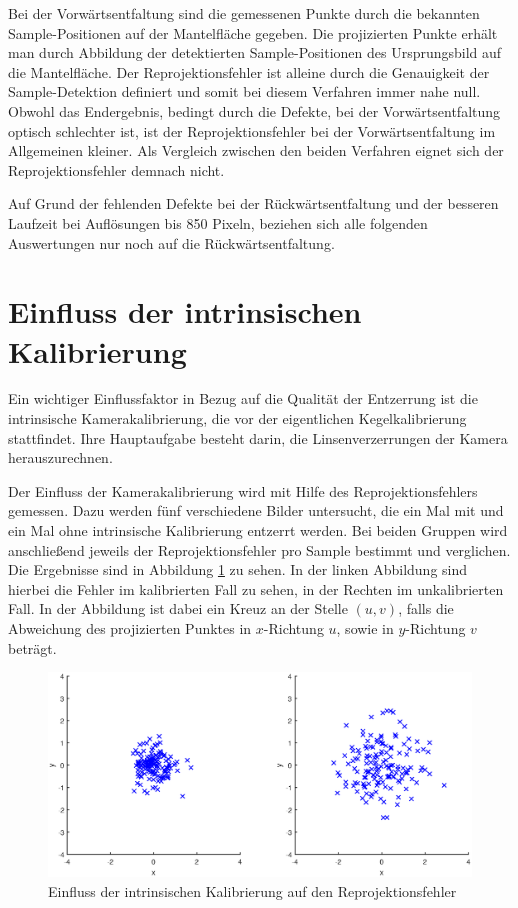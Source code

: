 Bei der Vorwärtsentfaltung sind die gemessenen Punkte durch die bekannten Sample-Positionen auf der Mantelfläche gegeben. Die projizierten Punkte erhält man durch Abbildung der detektierten Sample-Positionen des Ursprungsbild auf die Mantelfläche. Der Reprojektionsfehler ist alleine durch die Genauigkeit der Sample-Detektion definiert und somit bei diesem Verfahren immer nahe null.
Obwohl das Endergebnis, bedingt durch die Defekte, bei der Vorwärtsentfaltung optisch schlechter ist, ist der Reprojektionsfehler bei der Vorwärtsentfaltung im Allgemeinen kleiner.
Als Vergleich zwischen den beiden Verfahren eignet sich der Reprojektionsfehler demnach nicht.

Auf Grund der fehlenden Defekte bei der Rückwärtsentfaltung und der besseren Laufzeit bei Auflösungen bis 850 Pixeln, beziehen sich alle folgenden Auswertungen nur noch auf die Rückwärtsentfaltung.


\section{Einfluss der intrinsischen Kalibrierung}
Ein wichtiger Einflussfaktor in Bezug auf die Qualität der Entzerrung ist die intrinsische Kamerakalibrierung, die vor der eigentlichen Kegelkalibrierung stattfindet. Ihre Hauptaufgabe besteht darin, die Linsenverzerrungen der Kamera herauszurechnen.

Der Einfluss der Kamerakalibrierung wird mit Hilfe des Reprojektionsfehlers gemessen. Dazu werden fünf verschiedene Bilder untersucht, die ein Mal mit und ein Mal ohne intrinsische Kalibrierung entzerrt werden. Bei beiden Gruppen wird anschließend jeweils der Reprojektionsfehler pro Sample bestimmt und verglichen. Die Ergebnisse sind in Abbildung \ref{fig:influenceCalib} zu sehen. In der linken Abbildung sind hierbei die Fehler im kalibrierten Fall zu sehen, in der Rechten im unkalibrierten Fall. In der Abbildung ist dabei ein Kreuz an der Stelle $(u,v)$, falls die Abweichung des projizierten Punktes in $x$-Richtung $u$, sowie in $y$-Richtung $v$ beträgt.

\begin{figure}[!htb]
	\centering
	\includegraphics[width=\textwidth]{images/reprojectionErrorReverse.eps}
	\caption{Einfluss der intrinsischen Kalibrierung auf den Reprojektionsfehler}
	\label{fig:influenceCalib}
\end{figure}


